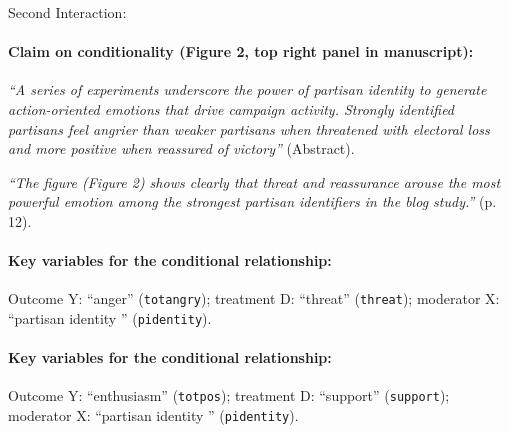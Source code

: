 \documentclass[12pt]{article}
\begin{document}
\clearpage
\noindent Second Interaction:


\paragraph{Claim on conditionality (Figure 2, top right panel in manuscript):} \emph{``A series of
  experiments underscore the power of partisan identity to generate
  action-oriented emotions that drive campaign activity. Strongly
  identified partisans feel angrier than weaker partisans when
  threatened with electoral loss and more positive when reassured of
  victory''} (Abstract).

\emph{``The figure (Figure 2) shows clearly that threat and reassurance arouse the most powerful emotion among the strongest partisan identifiers in the blog study.''} (p. 12).

\paragraph{Key variables for the conditional relationship:} Outcome Y:
``anger'' (\texttt{totangry}); treatment D:
``threat'' (\texttt{threat}); moderator X: ``partisan identity '' (\texttt{pidentity}). 

\paragraph{Key variables for the conditional relationship:} Outcome Y:
``enthusiasm'' (\texttt{totpos}); treatment D: ``support'' (\texttt{support}); moderator X: ``partisan identity '' (\texttt{pidentity}).  


\clearpage
\end{document}
